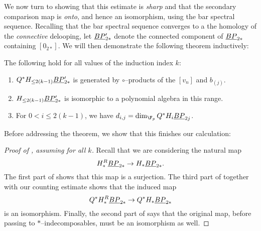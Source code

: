 We now turn to showing that this estimate is \emph{sharp} and that the secondary comparison map is \emph{onto}, and hence an isomorphism, using the bar spectral sequence.  Recalling that the bar spectral sequence converges to a the homology of the \emph{connective} delooping, let $\underline{\smash{BP}}_{2*}'$ denote the connected component of $\underline{\smash{BP}}_{2*}$ containing $[0_{2*}]$.  We will then demonstrate the following theorem inductively:
\begin{theorem}\label{HFpBPCooperationsInduction}
The following hold for all values of the induction index $k$:
\begin{enumerate}
\item $Q^* H_{\le 2(k-1)} \underline{\smash{BP}}_{2*}'$ is generated by $\circ$--products of the $[v_n]$ and $b_{(j)}$.
\item $H_{\le 2(k-1)} \underline{\smash{BP}}_{2*}'$ is isomorphic to a polynomial algebra in this range.
\item For $0 < i \le 2(k-1)$, we have $d_{i,j} = \dim_{\F_p} Q^* H_i \OS{BP}{2j}$.
\end{enumerate}
\end{theorem}

\noindent Before addressing the theorem, we show that this finishes our calculation:
\begin{proof}[{Proof of , assuming  for all $k$}]
Recall that we are considering the natural map \[H_*^R \underline{\smash{BP}}_{2*} \to H_* \underline{\smash{BP}}_{2*}.\]  The first part of  shows that this map is a surjection.  The third part of  together with our counting estimate shows that the induced map \[Q^* H_*^R \underline{\smash{BP}}_{2*} \to Q^* H_* \underline{\smash{BP}}_{2*}\] is an isomorphism.  Finally, the second part of  says that the original map, before passing to $\ast$--indecomposables, must be an isomorphism as well.
\end{proof}


